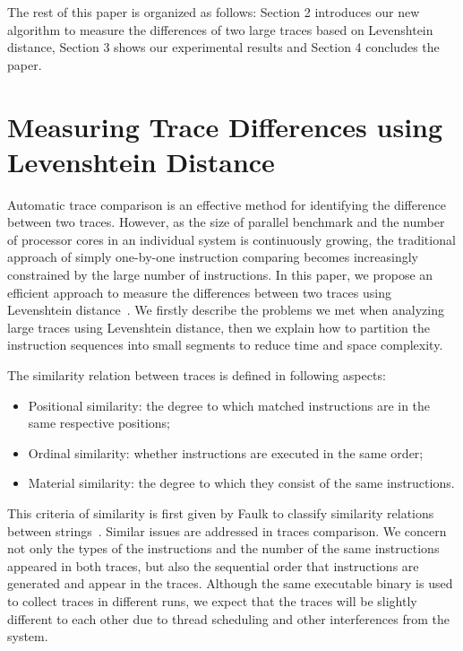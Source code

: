 \documentclass[10pt,journal,cspaper,compsoc]{IEEEtran}
\begin{document}
The rest of this paper is organized as follows: Section 2 introduces
our new algorithm to measure the differences of two large traces
based on Levenshtein distance, Section 3 shows our experimental
results and Section 4 concludes the paper.

\section{Measuring Trace Differences using Levenshtein Distance}
Automatic trace comparison is an effective method for identifying
the difference between two traces. However, as the size of parallel
benchmark and the number of processor cores in an individual system
is continuously growing, the traditional approach of simply
one-by-one instruction comparing becomes increasingly constrained by
the large number of instructions. In this paper, we propose an
efficient approach to measure the differences between two traces
using Levenshtein distance~\cite{ld1996}. We firstly describe the
problems we met when analyzing large traces using Levenshtein
distance, then we explain how to partition the instruction sequences
into small segments to reduce time and space complexity.

The similarity relation between traces is defined in following
aspects:
\begin{itemize}
  \item Positional similarity: the degree to which matched instructions are in the same
respective positions;
  \item Ordinal similarity: whether instructions are executed in the same order;
  \item Material similarity: the degree to which they consist of the same
  instructions.
\end{itemize}

This criteria of similarity is first given by Faulk to classify
similarity relations between strings~\cite{Faulk1964}. Similar
issues are addressed in traces comparison. We concern not only the
types of the instructions and the number of the same instructions
appeared in both traces, but also the sequential order that
instructions are generated and appear in the traces. Although the
same executable binary is used to collect traces in different runs,
we expect that the traces will be slightly different to each other
due to thread scheduling and other interferences from the system.
\end{document}
